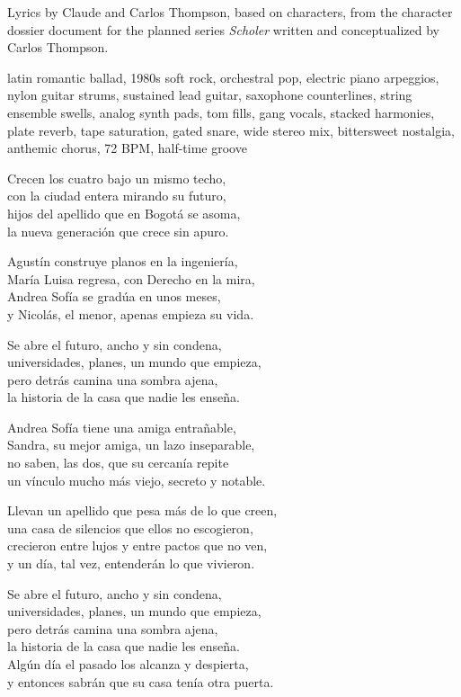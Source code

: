 
\begin{notes}
Lyrics by Claude and Carlos Thompson, based on characters, %
from the character dossier document for the planned series \emph{Scholer} %
written and conceptualized by Carlos Thompson.
\end{notes}
\begin{style}
latin romantic ballad, 1980s soft rock, orchestral pop, electric piano arpeggios, nylon guitar strums, sustained lead guitar, saxophone counterlines, string ensemble swells, analog synth pads, tom fills, gang vocals, stacked harmonies, plate reverb, tape saturation, gated snare, wide stereo mix, bittersweet nostalgia, anthemic chorus, 72 BPM, half-time groove
\end{style}
\begin{lyrics}
Crecen los cuatro bajo un mismo techo,\\
con la ciudad entera mirando su futuro,\\
hijos del apellido que en Bogotá se asoma,\\
la nueva generación que crece sin apuro.

Agustín construye planos en la ingeniería,\\
María Luisa regresa, con Derecho en la mira,\\
Andrea Sofía se gradúa en unos meses,\\
y Nicolás, el menor, apenas empieza su vida.

Se abre el futuro, ancho y sin condena,\\
universidades, planes, un mundo que empieza,\\
pero detrás camina una sombra ajena,\\
la historia de la casa que nadie les enseña.

Andrea Sofía tiene una amiga entrañable,\\
Sandra, su mejor amiga, un lazo inseparable,\\
no saben, las dos, que su cercanía repite\\
un vínculo mucho más viejo, secreto y notable.

Llevan un apellido que pesa más de lo que creen,\\
una casa de silencios que ellos no escogieron,\\
crecieron entre lujos y entre pactos que no ven,\\
y un día, tal vez, entenderán lo que vivieron.

Se abre el futuro, ancho y sin condena,\\
universidades, planes, un mundo que empieza,\\
pero detrás camina una sombra ajena,\\
la historia de la casa que nadie les enseña.\\
Algún día el pasado los alcanza y despierta,\\
y entonces sabrán que su casa tenía otra puerta.
\end{lyrics}
